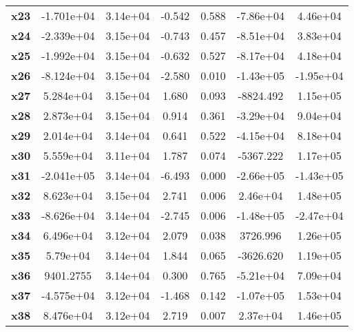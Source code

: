 \documentclass{article}
\begin{document}
\begin{center}
{\begin{tabular}{lcccccc}
\textbf{x23}   &   -1.701e+04  &     3.14e+04     &    -0.542  &         0.588        &    -7.86e+04    &     4.46e+04     \\
\textbf{x24}   &   -2.339e+04  &     3.15e+04     &    -0.743  &         0.457        &    -8.51e+04    &     3.83e+04     \\
\textbf{x25}   &   -1.992e+04  &     3.15e+04     &    -0.632  &         0.527        &    -8.17e+04    &     4.18e+04     \\
\textbf{x26}   &   -8.124e+04  &     3.15e+04     &    -2.580  &         0.010        &    -1.43e+05    &    -1.95e+04     \\
\textbf{x27}   &    5.284e+04  &     3.15e+04     &     1.680  &         0.093        &    -8824.492    &     1.15e+05     \\
\textbf{x28}   &    2.873e+04  &     3.15e+04     &     0.914  &         0.361        &    -3.29e+04    &     9.04e+04     \\
\textbf{x29}   &    2.014e+04  &     3.14e+04     &     0.641  &         0.522        &    -4.15e+04    &     8.18e+04     \\
\textbf{x30}   &    5.559e+04  &     3.11e+04     &     1.787  &         0.074        &    -5367.222    &     1.17e+05     \\
\textbf{x31}   &   -2.041e+05  &     3.14e+04     &    -6.493  &         0.000        &    -2.66e+05    &    -1.43e+05     \\
\textbf{x32}   &    8.623e+04  &     3.15e+04     &     2.741  &         0.006        &     2.46e+04    &     1.48e+05     \\
\textbf{x33}   &   -8.626e+04  &     3.14e+04     &    -2.745  &         0.006        &    -1.48e+05    &    -2.47e+04     \\
\textbf{x34}   &    6.496e+04  &     3.12e+04     &     2.079  &         0.038        &     3726.996    &     1.26e+05     \\
\textbf{x35}   &     5.79e+04  &     3.14e+04     &     1.844  &         0.065        &    -3626.620    &     1.19e+05     \\
\textbf{x36}   &    9401.2755  &     3.14e+04     &     0.300  &         0.765        &    -5.21e+04    &     7.09e+04     \\
\textbf{x37}   &   -4.575e+04  &     3.12e+04     &    -1.468  &         0.142        &    -1.07e+05    &     1.53e+04     \\
\textbf{x38}   &    8.476e+04  &     3.12e+04     &     2.719  &         0.007        &     2.37e+04    &     1.46e+05     \\

\end{tabular}}
\end{center}
\end{document}
